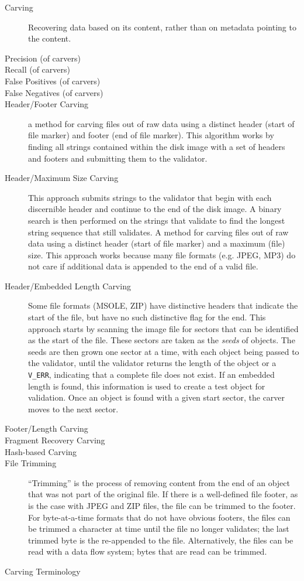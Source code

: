\documentclass[11pt,letter]{article}
\begin{document}
\begin{table}
\begin{description}
\item[Carving] Recovering data based on its content, rather than on
  metadata pointing to the content.
\item[Precision (of carvers)]
\item[Recall (of carvers)]
\item[False Positives (of carvers)]
\item[False Negatives (of carvers)]
\item[Header/Footer Carving] a method for carving files out of raw
data using a distinct header (start of file marker) and footer (end of
file marker). This algorithm works by finding all strings contained
within the disk image with a set of headers and footers and submitting
them to the validator. 

\item[Header/Maximum Size Carving] This approach submits strings to the validator that begin with each
discernible header and continue to the end of the disk image. A
binary search is then performed on the strings that validate to find
the longest string sequence that still validates. A method for carving
files out of raw data using a distinct header (start of file marker)
and a maximum (file) size. This approach works because many file
formats (e.g. JPEG, MP3) do not care if additional data is appended to
the end of a valid file.

\item[Header/Embedded Length Carving] Some file formats (MSOLE, ZIP) have distinctive headers that indicate
the start of the file, but have no such distinctive flag for the
end. This approach starts by scanning the image file for sectors that can be
identified as the start of the file. These sectors are taken as the
\emph{seeds} of objects. The seeds are then grown one sector at a
time, with each object being passed to the validator, until the
validator returns the length of the object or a \verb+V_ERR+,
indicating that a complete file does not exist. If an embedded length
is found, this information is used to create a test object for
validation. Once an object is found with a given start sector, the
carver moves to the next sector. 

\item[Footer/Length Carving]
\item[Fragment Recovery Carving]
\item[Hash-based Carving]
\item[File Trimming] ``Trimming'' is the process of removing content from the end of an
object that was not part of the original file. If there is a well-defined file footer, as is
the case with JPEG and ZIP files, the file can be trimmed to the
footer. For byte-at-a-time formats that do not have obvious footers, the files can 
be trimmed a character at time until the file no longer validates; the last
trimmed byte is the re-appended to the file.  Alternatively, the files
can be read with a data flow system; bytes that are read can be trimmed.
\end{description}
\caption{Carving Terminology}
\end{table}
\end{document}
